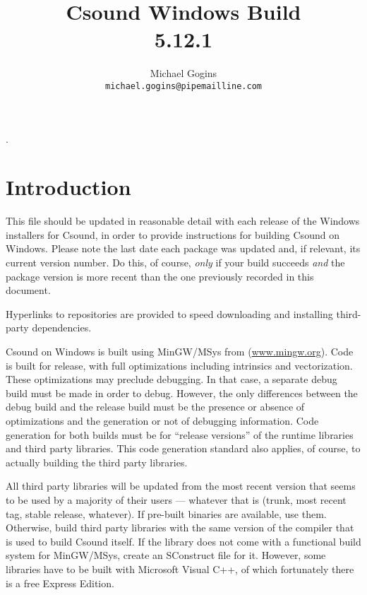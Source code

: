 \documentclass[11pt,letterpaper,onecolumn]{scrartcl}
\begin{document}
\begin{sloppypar}

.
\title{Csound Windows Build \\ 5.12.1}

\author{Michael Gogins \\ \texttt{michael.gogins@pipemailline.com}}
\maketitle

\section{Introduction}
\label{sec:Introduction}

This file should be updated in reasonable detail with each release of the Windows installers for Csound, in order to provide instructions for building Csound on Windows. Please note the last date each package was updated and, if relevant, its current version number. Do this, of course, \emph{only} if your build succeeds \emph{and} the package version is more recent than the one previously recorded in this document.

Hyperlinks to repositories are provided to speed downloading and installing third-party dependencies.

Csound on Windows is built using MinGW/MSys from (\url{www.mingw.org}). Code is built for release, with full optimizations including intrinsics and vectorization. These optimizations may preclude debugging. In that case, a separate debug build must be made in order to debug. However, the only differences between the debug build and the release build must be the presence or absence of optimizations and the generation or not of debugging information. Code generation for both builds must be for ``release versions'' of the runtime libraries and third party libraries. This code generation standard also applies, of course, to actually building the third party libraries.

All third party libraries will be updated from the most recent version that seems to be used by a majority of their users --- whatever that is (trunk, most recent tag, stable release, whatever). If pre-built binaries are available, use them. Otherwise, build third party libraries with the same version of the compiler that is used to build Csound itself. If the library does not come with a functional build system for MinGW/MSys, create an SConstruct file for it. However, some libraries have to be built with Microsoft Visual C++, of which fortunately there is a free Express Edition.


\end{sloppypar}
\end{document}
